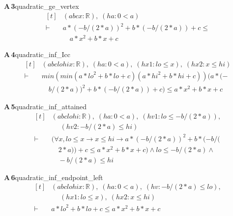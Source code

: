 \documentclass[conference]{IEEEtran}
\theoremstyle{definition}
\newcommand{\lean}[1]{\textsf{\footnotesize #1}}
\begin{document}
\noindent\textbf{A\,3}\quad\lean{quadratic\_ge\_vertex}
{\footnotesize\[ \begin{aligned}[t]
&(\mathit{a} \mathit{b} \mathit{c} \mathit{x} : \mathbb{R} ),\; (\mathit{ha} : 0 < \mathit{a})\\
\vdash\;&\mathit{a} * (-\mathit{b} / (2 * \mathit{a})) ^{2} + \mathit{b} * (-\mathit{b} / (2 * \mathit{a})) + \mathit{c} \leq\\
&\quad \mathit{a} * \mathit{x} ^{2} + \mathit{b} * \mathit{x} + \mathit{c}
\end{aligned} \]}

\noindent\textbf{A\,4}\quad\lean{quadratic\_inf\_Icc}
{\footnotesize\[ \begin{aligned}[t]
&(\mathit{a} \mathit{b} \mathit{c} \mathit{lo} \mathit{hi} \mathit{x} : \mathbb{R} ),\; (\mathit{ha} : 0 < \mathit{a}),\; (\mathit{hx1} : \mathit{lo} \leq \mathit{x}),\; (\mathit{hx2} : \mathit{x} \leq \mathit{hi})\\
\vdash\;&\mathit{min} (\mathit{min} (\mathit{a} * \mathit{lo} ^{2} + \mathit{b} * \mathit{lo} + \mathit{c}) (\mathit{a} * \mathit{hi} ^{2} + \mathit{b} * \mathit{hi} + \mathit{c})) (\mathit{a} * (-\\
&\quad \mathit{b} / (2 * \mathit{a})) ^{2} + \mathit{b} * (-\mathit{b} / (2 * \mathit{a})) + \mathit{c}) \leq \mathit{a} * \mathit{x} ^{2} + \mathit{b} * \mathit{x} + \mathit{c}
\end{aligned} \]}

\noindent\textbf{A\,5}\quad\lean{quadratic\_inf\_attained}
{\footnotesize\[ \begin{aligned}[t]
&(\mathit{a} \mathit{b} \mathit{c} \mathit{lo} \mathit{hi} : \mathbb{R} ),\; (\mathit{ha} : 0 < \mathit{a}),\; (\mathit{hv1} : \mathit{lo} \leq -\mathit{b} / (2 * \mathit{a})),\\
&\quad \; (\mathit{hv2} : -\mathit{b} / (2 * \mathit{a}) \leq \mathit{hi})\\
\vdash\;&(\forall \mathit{x}, \mathit{lo} \leq \mathit{x} \to \mathit{x} \leq \mathit{hi} \to \mathit{a} * (-\mathit{b} / (2 * \mathit{a})) ^{2} + \mathit{b} * (-\mathit{b} / (\\
&\quad 2 * \mathit{a})) + \mathit{c} \leq \mathit{a} * \mathit{x} ^{2} + \mathit{b} * \mathit{x} + \mathit{c}) \wedge \mathit{lo} \leq -\mathit{b} / (2 * \mathit{a}) \wedge\\
&\quad -\mathit{b} / (2 * \mathit{a}) \leq \mathit{hi}
\end{aligned} \]}

\noindent\textbf{A\,6}\quad\lean{quadratic\_inf\_endpoint\_left}
{\footnotesize\[ \begin{aligned}[t]
&(\mathit{a} \mathit{b} \mathit{c} \mathit{lo} \mathit{hi} \mathit{x} : \mathbb{R} ),\; (\mathit{ha} : 0 < \mathit{a}),\; (\mathit{hv} : -\mathit{b} / (2 * \mathit{a}) \leq \mathit{lo}),\\
&\quad \; (\mathit{hx1} : \mathit{lo} \leq \mathit{x}),\; (\mathit{hx2} : \mathit{x} \leq \mathit{hi})\\
\vdash\;&\mathit{a} * \mathit{lo} ^{2} + \mathit{b} * \mathit{lo} + \mathit{c} \leq \mathit{a} * \mathit{x} ^{2} + \mathit{b} * \mathit{x} + \mathit{c}
\end{aligned} \]}
\end{document}
